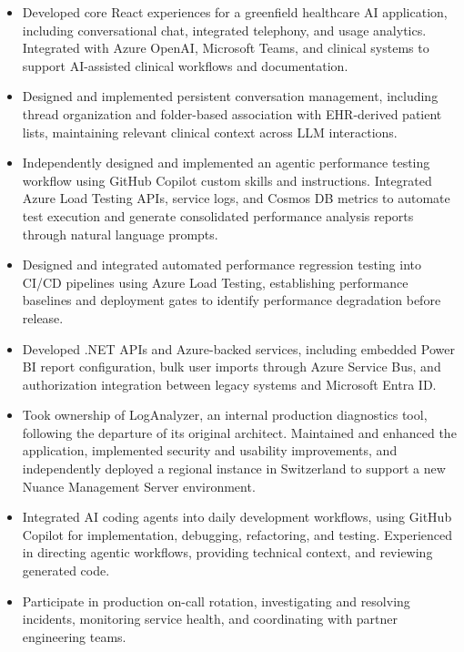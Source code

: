 \documentclass[letterpaper,10pt]{article}
\newcommand{\resumeBullet}[1]{
    \item #1
}
\begin{document}
\begin{itemize}

    \resumeBullet{
        Developed core React experiences for a greenfield healthcare
        AI application, including conversational chat, integrated
        telephony, and usage analytics. Integrated with Azure OpenAI,
        Microsoft Teams, and clinical systems to support AI-assisted
        clinical workflows and documentation.
    }

    \resumeBullet{
        Designed and implemented persistent conversation management,
        including thread organization and folder-based association
        with EHR-derived patient lists, maintaining relevant clinical
        context across LLM interactions.
    }

    \resumeBullet{
        Independently designed and implemented an agentic performance
        testing workflow using GitHub Copilot custom skills and
        instructions. Integrated Azure Load Testing APIs, service
        logs, and Cosmos DB metrics to automate test execution and
        generate consolidated performance analysis reports through
        natural language prompts.
    }

    \resumeBullet{
        Designed and integrated automated performance regression
        testing into CI/CD pipelines using Azure Load Testing,
        establishing performance baselines and deployment gates to
        identify performance degradation before release.
    }

    \resumeBullet{
        Developed .NET APIs and Azure-backed services, including
        embedded Power BI report configuration, bulk user imports
        through Azure Service Bus, and authorization integration
        between legacy systems and Microsoft Entra ID.
    }

    \resumeBullet{
        Took ownership of LogAnalyzer, an internal production
        diagnostics tool, following the departure of its original
        architect. Maintained and enhanced the application,
        implemented security and usability improvements, and
        independently deployed a regional instance in Switzerland
        to support a new Nuance Management Server environment.
    }

    \resumeBullet{
        Integrated AI coding agents into daily development workflows,
        using GitHub Copilot for implementation, debugging,
        refactoring, and testing. Experienced in directing agentic
        workflows, providing technical context, and reviewing
        generated code.
    }

    \resumeBullet{
        Participate in production on-call rotation, investigating
        and resolving incidents, monitoring service health, and
        coordinating with partner engineering teams.
    }

\end{itemize}
\end{document}
